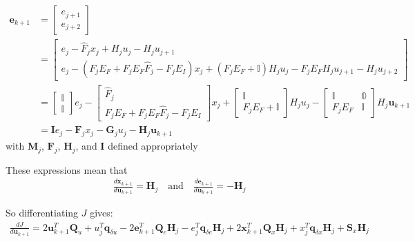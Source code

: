 \documentclass[landscape]{article}
\begin{document}
\begin{align}
\mathbf{e}_{k+1} 
& = \begin{bmatrix} e_{j+1} \\ e_{j+2}\end{bmatrix} \\
& = \begin{bmatrix} e_j - \hat{F}_j x_j + H_j u_j - H_j u_{j+1} \\ e_j - \left(F_j E_F + F_j E_F \hat{F}_j - F_j E_I\right)x_j + \left(F_j E_F +\mathbb{I} \right) H_j u_j - F_j E_F H_j u_{j+1}   - H_j u_{j+2}\end{bmatrix} \\
& = 
\begin{bmatrix} \mathbb{I}       \\   \mathbb{I}   \end{bmatrix}              e_j 
- \begin{bmatrix} \hat{F}_j        \\  F_j E_F + F_j E_F \hat{F}_j - F_j E_I  \end{bmatrix}              x_j 
+ \begin{bmatrix} \mathbb{I}       \\   F_j E_F + \mathbb{I}  \end{bmatrix} H_j u_j
- \begin{bmatrix} \mathbb{I} & \mathbb{0} \\   F_j E_F  & \mathbb{I}     \end{bmatrix} H_j \mathbf{u}_{k+1} \\
& = \mathbf{I} e_j - \mathbf{F}_j x_j - \mathbf{G}_j u_j - \mathbf{H}_j \mathbf{u}_{k+1} 
\end{align}
with $\mathbf{M}_j$, $\mathbf{F}_j$, $\mathbf{H}_j$, and $\mathbf{I}$ defined appropriately 

These expressions mean that 
\begin{align}
\frac{d\mathbf{x}_{k+1} }{d\mathbf{u}_{k+1} } = \mathbf{H}_j \quad \mathrm{and} \quad
\frac{d\mathbf{e}_{k+1} }{d\mathbf{u}_{k+1} } = -\mathbf{H}_j
\end{align}

So differentiating $J$ gives:
\begin{align}
\frac{dJ}{d\mathbf{u}_{k+1} } 
= 2 \mathbf{u}_{k+1}^T \mathbf{Q}_u 
+ u_j^T \mathbf{q}_{\delta u} 
- 2 \mathbf{e}_{k+1}^T \mathbf{Q}_e \mathbf{H}_j 
- e_j^T \mathbf{q}_{\delta e} \mathbf{H}_j
+ 2 \mathbf{x}_{k+1}^T \mathbf{Q}_x \mathbf{H}_j
+ x_j^T \mathbf{q}_{\delta x} \mathbf{H}_j  
+ \mathbf{S}_x \mathbf{H}_j
\end{align}
\end{document}
